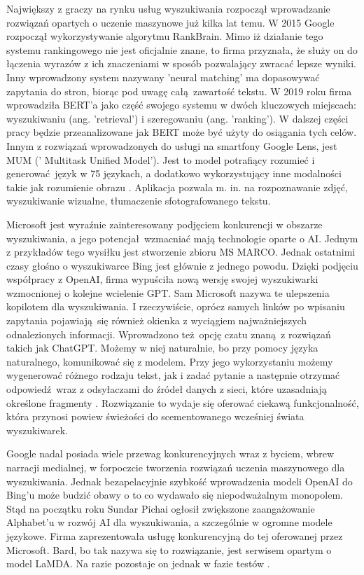 Największy z graczy na rynku usług wyszukiwania rozpoczął wprowadzanie rozwiązań opartych o uczenie maszynowe już kilka lat temu. W 2015 Google rozpoczął wykorzystywanie algorytmu RankBrain. Mimo iż działanie tego systemu rankingowego nie jest oficjalnie znane, to firma przyznała, że służy on do łączenia wyrazów z ich znaczeniami w sposób pozwalający zwracać lepsze wyniki. Inny wprowadzony system nazywany 'neural matching' ma dopasowywać zapytania do stron, biorąc pod uwagę całą zawartość tekstu. W 2019 roku firma wprowadziła BERT'a jako część swojego systemu w dwóch kluczowych miejscach: wyszukiwaniu (ang. 'retrieval') i szeregowaniu (ang. 'ranking'). W dalszej części pracy będzie przeanalizowane jak BERT może być użyty do osiągania tych celów. Innym z rozwiązań wprowadzonych do usługi na smartfony Google Lens, jest MUM (' Multitask Unified Model'). Jest to model potrafiący rozumieć i generować język w 75 językach, a dodatkowo wykorzystujący inne modalności takie jak rozumienie obrazu \autocite{howaipowers}. Aplikacja pozwala m. in. na rozpoznawanie zdjęć, wyszukiwanie wizualne, tłumaczenie sfotografowanego tekstu.\newline

Microsoft jest wyraźnie zainteresowany podjęciem konkurencji w obszarze wyszukiwania, a jego potencjał wzmacniać mają technologie oparte o AI. Jednym z przykładów tego wysiłku jest stworzenie zbioru MS MARCO. Jednak ostatnimi czasy głośno o wyszukiwarce Bing jest głównie z jednego powodu. Dzięki podjęciu współpracy z OpenAI, firma wypuściła nową wersję swojej wyszukiwarki wzmocnionej o kolejne wcielenie GPT. Sam Microsoft nazywa te ulepszenia kopilotem dla wyszukiwania. I rzeczywiście, oprócz samych linków po wpisaniu zapytania pojawiają się również okienka z wyciągiem najważniejszych odnalezionych informacji. Wprowadzono też opcję czatu znaną z rozwiązań takich jak ChatGPT. Możemy w niej naturalnie, bo przy pomocy języka naturalnego, komunikować się z modelem. Przy jego wykorzystaniu możemy wygenerować różnego rodzaju tekst, jak i zadać pytanie a następnie otrzymać odpowiedź wraz z odsyłaczami do źródeł danych z sieci, które uzasadniają określone fragmenty \autocite{reinventingsearch}. Rozwiązanie to wydaje się oferować ciekawą funkcjonalność, która przynosi powiew świeżości do scementowanego wcześniej świata wyszukiwarek. \newline  

Google nadal posiada wiele przewag konkurencyjnych wraz z byciem, wbrew narracji medialnej, w forpoczcie tworzenia rozwiązań uczenia maszynowego dla wyszukiwania. Jednak bezapelacyjnie szybkość wprowadzenia modeli OpenAI do Bing'u może budzić obawy o to co wydawało się niepodważalnym monopolem. Stąd na początku roku Sundar Pichai ogłosił zwiększone zaangażowanie Alphabet'u w rozwój AI dla wyszukiwania, a szczególnie w ogromne modele językowe. Firma zaprezentowała usługę konkurencyjną do tej oferowanej przez Microsoft. Bard, bo tak nazywa się to rozwiązanie, jest serwisem opartym o model LaMDA. Na razie pozostaje on jednak w fazie testów  \autocite{importantnextstep}.

